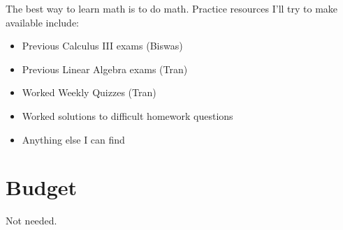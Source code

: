 \documentclass{article}
\begin{document}
The best way to learn math is to do math. Practice 
resources I'll try to make available include:

\begin{itemize}
    \item Previous Calculus III exams (Biswas)
    \item Previous Linear Algebra exams (Tran)
    \item Worked Weekly Quizzes (Tran)
    \item Worked solutions to difficult homework questions
    \item Anything else I can find
\end{itemize}

\section*{Budget}
Not needed.
\end{document}
